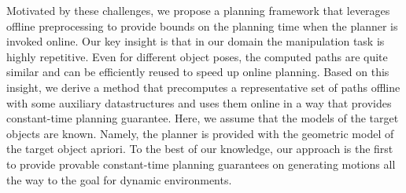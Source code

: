 \documentclass[conference]{IEEEtran}
\begin{document}
Motivated by these challenges, we propose a planning framework that leverages offline preprocessing to provide bounds on the planning time when the planner is invoked online. Our key insight is that in our domain the manipulation task is highly repetitive. Even for different object poses, the computed paths are quite similar and can be efficiently reused to speed up online planning. Based on this insight, we derive a method that precomputes a representative set of paths offline with some auxiliary datastructures and uses them online in a way that provides constant-time planning guarantee. Here, we assume that the models of the target objects are known. Namely, the planner is provided with the geometric model of the target object apriori. To the best of our knowledge, our approach is the first to provide provable constant-time planning guarantees on generating motions all the way to the goal for dynamic environments.
\end{document}
